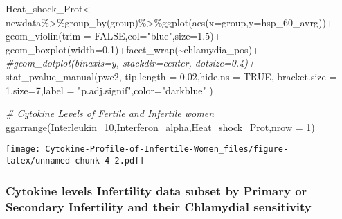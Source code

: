 \documentclass[
]{article}
\newenvironment{Shaded}{\begin{snugshade}}{\end{snugshade}}
\newcommand{\AttributeTok}[1]{\textcolor[rgb]{0.77,0.63,0.00}{#1}}
\newcommand{\CommentTok}[1]{\textcolor[rgb]{0.56,0.35,0.01}{\textit{#1}}}
\newcommand{\ConstantTok}[1]{\textcolor[rgb]{0.00,0.00,0.00}{#1}}
\newcommand{\DecValTok}[1]{\textcolor[rgb]{0.00,0.00,0.81}{#1}}
\newcommand{\FloatTok}[1]{\textcolor[rgb]{0.00,0.00,0.81}{#1}}
\newcommand{\FunctionTok}[1]{\textcolor[rgb]{0.00,0.00,0.00}{#1}}
\newcommand{\NormalTok}[1]{#1}
\newcommand{\OtherTok}[1]{\textcolor[rgb]{0.56,0.35,0.01}{#1}}
\newcommand{\SpecialCharTok}[1]{\textcolor[rgb]{0.00,0.00,0.00}{#1}}
\newcommand{\StringTok}[1]{\textcolor[rgb]{0.31,0.60,0.02}{#1}}
\begin{document}
\begin{Shaded}
\begin{Highlighting}[]
\NormalTok{Heat\_shock\_Prot}\OtherTok{\textless{}{-}}\NormalTok{newdata}\SpecialCharTok{\%\textgreater{}\%}\FunctionTok{group\_by}\NormalTok{(group)}\SpecialCharTok{\%\textgreater{}\%}\FunctionTok{ggplot}\NormalTok{(}\FunctionTok{aes}\NormalTok{(}\AttributeTok{x=}\NormalTok{group,}\AttributeTok{y=}\NormalTok{hsp\_60\_avrg))}\SpecialCharTok{+}
  \FunctionTok{geom\_violin}\NormalTok{(}\AttributeTok{trim =} \ConstantTok{FALSE}\NormalTok{,}\AttributeTok{col=}\StringTok{"blue"}\NormalTok{,}\AttributeTok{size=}\FloatTok{1.5}\NormalTok{)}\SpecialCharTok{+}
  \FunctionTok{geom\_boxplot}\NormalTok{(}\AttributeTok{width=}\FloatTok{0.1}\NormalTok{)}\SpecialCharTok{+}\FunctionTok{facet\_wrap}\NormalTok{(}\SpecialCharTok{\textasciitilde{}}\NormalTok{chlamydia\_pos)}\SpecialCharTok{+}
  \CommentTok{\#geom\_dotplot(binaxis=\textquotesingle{}y\textquotesingle{}, stackdir=\textquotesingle{}center\textquotesingle{}, dotsize=0.4)+}
  \FunctionTok{stat\_pvalue\_manual}\NormalTok{(pwc2, }\AttributeTok{tip.length =} \FloatTok{0.02}\NormalTok{,}\AttributeTok{hide.ns =} \ConstantTok{TRUE}\NormalTok{,}
                     \AttributeTok{bracket.size =} \DecValTok{1}\NormalTok{,}\AttributeTok{size=}\DecValTok{7}\NormalTok{,}\AttributeTok{label =} \StringTok{"p.adj.signif"}\NormalTok{,}\AttributeTok{color=}\StringTok{"darkblue"}\NormalTok{ )}

\CommentTok{\# Cytokine Levels of Fertile and Infertile women }
\FunctionTok{ggarrange}\NormalTok{(Interleukin\_10,Interferon\_alpha,Heat\_shock\_Prot,}\AttributeTok{nrow =} \DecValTok{1}\NormalTok{)}
\end{Highlighting}
\end{Shaded}

\texttt{[image: Cytokine-Profile-of-Infertile-Women\_files/figure-latex/unnamed-chunk-4-2.pdf]}

\hypertarget{cytokine-levels-infertility-data-subset-by-primary-or-secondary-infertility-and-their-chlamydial-sensitivity}{%
\subsubsection{Cytokine levels Infertility data subset by Primary or
Secondary Infertility and their Chlamydial
sensitivity}\label{cytokine-levels-infertility-data-subset-by-primary-or-secondary-infertility-and-their-chlamydial-sensitivity}}
\end{document}
